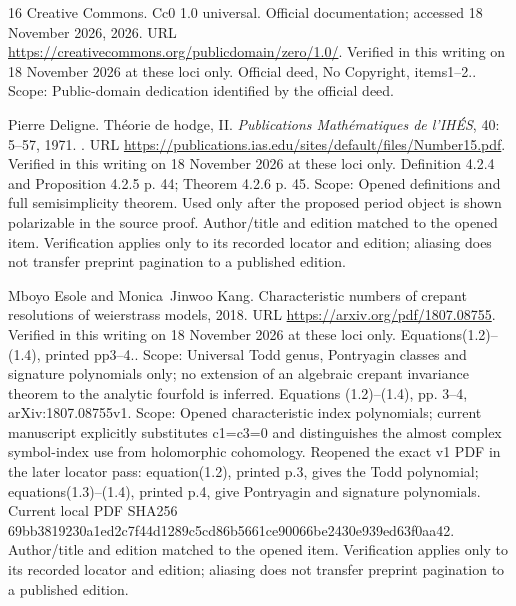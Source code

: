 \documentclass[11pt,a4paper]{article}
\theoremstyle{definition}
\begin{document}
\begin{thebibliography}{16}
{Creative Commons}.
\newblock Cc0 1.0 universal.
\newblock Official documentation;\allowbreak{} accessed 18 November 2026, 2026.
\newblock URL \url{https://creativecommons.org/publicdomain/zero/1.0/}.
\newblock Verified in this writing on 18 November 2026 at these loci only.
  Official deed, No Copyright, items1–2.. Scope: Public-domain dedication
  identified by the official deed.

Pierre Deligne.
\newblock Th{\'e}orie de hodge, {II}.
\newblock \emph{Publications Math{\'e}matiques de l'IH{\'E}S}, 40:
  5--57, 1971.
\newblock {}.
\newblock URL
  \url{https://publications.ias.edu/sites/default/files/Number15.pdf}.
\newblock Verified in this writing on 18 November 2026 at these loci only.
  Definition 4.2.4 and Proposition 4.2.5 p. 44;\allowbreak{} Theorem 4.2.6 p. 45. Scope:
  Opened definitions and full semisimplicity theorem. Used only after the
  proposed period object is shown polarizable in the source proof. Author/title
  and edition matched to the opened item. Verification applies only to its
  recorded locator and edition;\allowbreak{} aliasing does not transfer preprint pagination
  to a published edition.

Mboyo Esole and Monica~Jinwoo Kang.
\newblock Characteristic numbers of crepant resolutions of weierstrass models,
  2018.
\newblock URL \url{https://arxiv.org/pdf/1807.08755}.
\newblock Verified in this writing on 18 November 2026 at these loci only.
  Equations(1.2)–(1.4), printed pp3–4.. Scope: Universal Todd genus,
  Pontryagin classes and signature polynomials only;\allowbreak{} no extension of an
  algebraic crepant invariance theorem to the analytic fourfold is inferred.
  Equations (1.2)–(1.4), pp. 3–4, arXiv:1807.08755v1. Scope: Opened
  characteristic index polynomials;\allowbreak{} current manuscript explicitly substitutes
  c1=c3=0 and distinguishes the almost complex symbol-index use from
  holomorphic cohomology. Reopened the exact v1 PDF in the later locator pass:
  equation(1.2), printed p.3, gives the Todd polynomial;\allowbreak{}
  equations(1.3)–(1.4), printed p.4, give Pontryagin and signature
  polynomials. Current local PDF SHA256
  69bb3819230a1ed2c7f44d1289c5cd86b5661ce90066be2430e939ed63f0aa42.
  Author/title and edition matched to the opened item. Verification applies
  only to its recorded locator and edition;\allowbreak{} aliasing does not transfer preprint
  pagination to a published edition.


\end{thebibliography}
\end{document}
